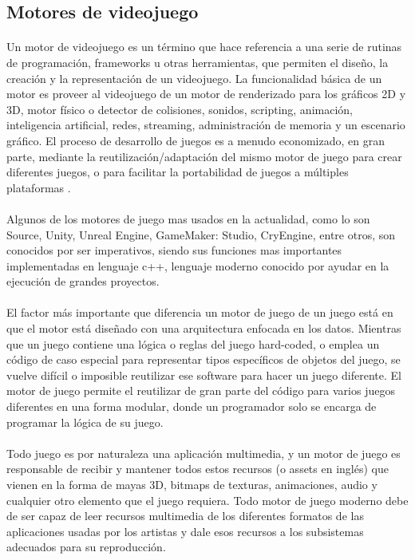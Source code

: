 \documentclass{standalone}
\begin{document}
\subsection{Motores de videojuego}

\paragraph{}
Un motor de videojuego es un término que hace referencia a una serie de rutinas de programación, frameworks u otras herramientas, que permiten el diseño, la creación y la representación de un videojuego. La funcionalidad básica de un motor es proveer al videojuego de un motor de renderizado para los gráficos 2D y 3D, motor físico o detector de colisiones, sonidos, scripting, animación, inteligencia artificial, redes, streaming, administración de memoria y un escenario gráfico. El proceso de desarrollo de juegos es a menudo economizado, en gran parte, mediante la reutilización/adaptación del mismo motor de juego para crear diferentes juegos, o para facilitar la portabilidad de juegos a múltiples plataformas \cite{JasonGregory-GameEngineArchitecture}.

\paragraph{}
Algunos de los motores de juego mas usados en la actualidad, como lo son Source, Unity, Unreal Engine, GameMaker: Studio, CryEngine, entre otros, son conocidos por ser imperativos, siendo sus funciones mas importantes implementadas en lenguaje c++, lenguaje moderno conocido por ayudar en la ejecución de grandes proyectos.

\paragraph{}
El factor más importante que diferencia un motor de juego de un juego está en que el motor está diseñado con una arquitectura enfocada en los datos. Mientras que un juego contiene una lógica o reglas del juego hard-coded, o emplea un código de caso especial para representar tipos específicos de objetos del juego, se vuelve difícil o imposible reutilizar ese software para hacer un juego diferente. El motor de juego permite el reutilizar de gran parte del código para varios juegos diferentes en una forma modular, donde un programador solo se encarga de programar la lógica de su juego.

\paragraph{}
Todo juego es por naturaleza una aplicación multimedia, y un motor de juego es responsable de recibir y mantener todos estos recursos (o assets en inglés) que vienen en la forma de mayas 3D, bitmaps de texturas, animaciones, audio y cualquier otro elemento que el juego requiera. Todo motor de juego moderno debe de ser capaz de leer recursos multimedia de los diferentes formatos de las aplicaciones usadas por los artistas y dale esos recursos a los subsistemas adecuados para su reproducción.
\end{document}
